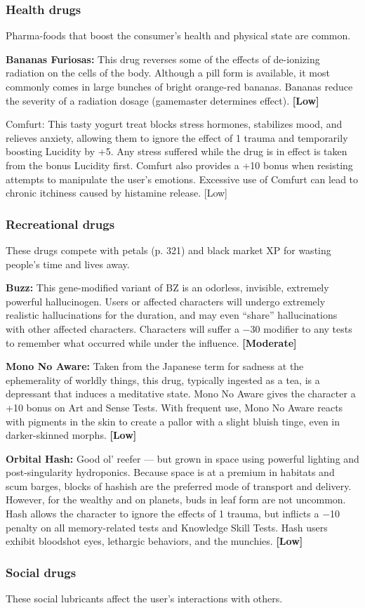 \subsubsection{Health drugs}

Pharma-foods that boost the consumer’s health and physical state are common.

\textbf{Bananas Furiosas:} This drug reverses some of the effects of de-ionizing radiation on the cells of the body. Although a pill form is available, it most commonly comes in large bunches of bright orange-red bananas. Bananas reduce the severity of a radiation dosage (gamemaster determines effect). \textbf{[Low]}

Comfurt: This tasty yogurt treat blocks stress hormones, stabilizes mood, and relieves anxiety, allowing them to ignore the effect of 1 trauma and temporarily boosting Lucidity by +5. Any stress suffered while the drug is in effect is taken from the bonus Lucidity first. Comfurt also provides a +10 bonus when resisting attempts to manipulate the user’s emotions. Excessive use of Comfurt can lead to chronic itchiness caused by histamine release. [Low]

\subsubsection{Recreational drugs}

These drugs compete with petals (p. 321) and black market XP for wasting people’s time and lives away.

\textbf{Buzz:} This gene-modified variant of BZ is an odorless, invisible, extremely powerful hallucinogen. Users or affected characters will undergo extremely realistic hallucinations for the duration, and may even ``share'' hallucinations with other affected characters. Characters will suffer a $-$30 modifier to any tests to remember what occurred while under the influence. \textbf{[Moderate]}

\textbf{Mono No Aware:} Taken from the Japanese term for sadness at the ephemerality of worldly things, this drug, typically ingested as a tea, is a depressant that induces a meditative state. Mono No Aware gives the character a +10 bonus on Art and Sense Tests. With frequent use, Mono No Aware reacts with pigments in the skin to create a pallor with a slight bluish tinge, even in darker-skinned morphs. \textbf{[Low]}

\textbf{Orbital Hash:} Good ol’ reefer --- but grown in space using powerful lighting and post-singularity hydroponics. Because space is at a premium in habitats and scum barges, blocks of hashish are the preferred mode of transport and delivery. However, for the wealthy and on planets, buds in leaf form are not uncommon. Hash allows the character to ignore the effects of 1 trauma, but inflicts a $-$10 penalty on all memory-related tests and Knowledge Skill Tests. Hash users exhibit bloodshot eyes, lethargic behaviors, and the munchies. \textbf{[Low]}\subsubsection{Social drugs}These social lubricants affect the user’s interactions with others.

